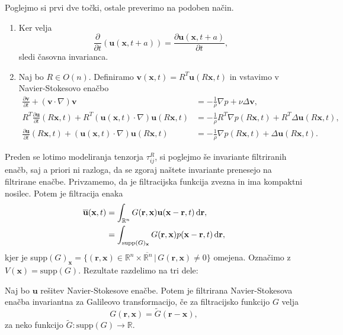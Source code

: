 \documentclass[mat2, tisk]{fmfdelo}
\newcommand{\R}{\mathbb R}
\newcommand{\bd}{\textbf}
\begin{document}
\begin{dokaz}
Poglejmo si prvi dve točki, ostale preverimo na podoben način.
\begin{enumerate}
  \item[i)] Ker velja $$\frac{\partial}{\partial t} (\bd{u}(\bd{x}, t + a)) = \frac{\partial \bd{u}(\bd{x}, t + a)}{\partial t},$$ sledi časovna invarianca.
  \item[ii)] Naj bo $R\in O(n)$. Definiramo $\bd{v}(\bd{x}, t) = R^T \bd{u}(R\bd{x}, t)$ in vstavimo v 
  Navier-Stokesovo enačbo 
  \begin{align*}
  \frac{\partial \bd{v}}{\partial t} + (\bd{v}\cdot \nabla)\bd{v} &= -\frac{1}{\rho} \nabla p + \nu \Delta \bd{v}, \\
  R^T \frac{\partial \bd{u}}{\partial t}(R\bd{x}, t) + R^T (\bd{u}(\bd{x}, t)\cdot \nabla)\bd{u}(R\bd{x}, t) &= -\frac{1}{\rho} R^T \nabla p(R\bd{x}, t) + R^T \Delta \bd{u}(R\bd{x}, t), \\
  \frac{\partial \bd{u}}{\partial t}(R\bd{x}, t) + (\bd{u}(\bd{x}, t)\cdot \nabla)\bd{u}(R\bd{x}, t) &= -\frac{1}{\rho} \nabla p(R\bd{x}, t) + \Delta \bd{u}(R\bd{x}, t).
  \end{align*}
\end{enumerate}
\end{dokaz}

Preden se lotimo modeliranja tenzorja $\tau_{ij}^R$, si poglejmo še invariante filtriranih enačb, 
saj a priori ni razloga, da se zgoraj naštete invariante prenesejo na filtrirane enačbe. 
Privzamemo, da je filtracijska funkcija zvezna in ima kompaktni nosilec. Potem je filtracija enaka
\begin{align*}
\overline{\bd{u}}(\bd{x}, t) &= \int_{\R^n} G(\bd{r}, \bd{x}) \bd{u}(\bd{x} - \bd{r}, t) \dif \bd{r}, \\
&= \int_{\text{supp}(G)_\bd{x}} G(\bd{r}, \bd{x}) p(\bd{x} - \bd{r}, t) \dif \bd{r},
\end{align*}
kjer je supp$(G)_\bd{x} = \overline{\{(\bd{r}, \bd{x}) \in \R^n \times \R^n \,|\, G(\bd{r}, \bd{x}) \neq 0 \}}$ omejena.
Označimo z $V(\bd{x}) = \text{supp}(G)$.
Rezultate razdelimo na tri dele:
\begin{lema}
Naj bo $\bd{u}$ rešitev Navier-Stokesove enačbe. Potem je filtrirana Navier-Stokesova enačba 
invariantna za Galileovo transformacijo, če za filtracijsko funkcijo $G$ velja 
$$
G(\bd{r}, \bd{x}) = \tilde{G}(\bd{r} - \bd{x}),
$$
za neko funkcijo $\tilde{G}: \text{supp}(G) \rightarrow \R$.
\end{lema}
\end{document}
